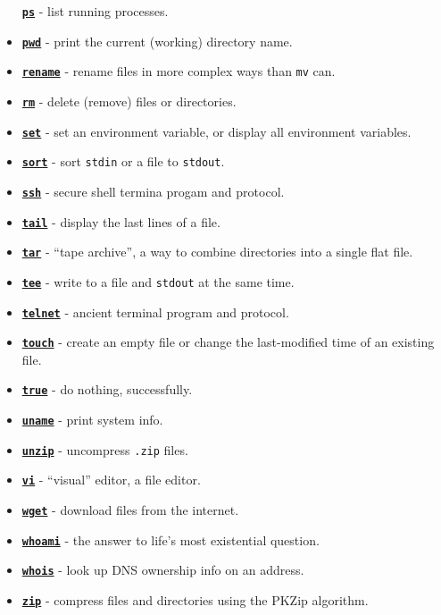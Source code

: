 \documentclass[10pt,]{book}
\numberwithin{figure}{chapter}
\begin{document}
\begin{itemize}
  \href{http://linux.die.net/man/1/ps}{\textbf{\texttt{ps}}} - list
  running processes.
\item
  \href{http://linux.die.net/man/1/pwd}{\textbf{\texttt{pwd}}} - print
  the current (working) directory name.
\item
  \href{http://linux.die.net/man/1/rename}{\textbf{\texttt{rename}}} -
  rename files in more complex ways than \texttt{mv} can.
\item
  \href{http://linux.die.net/man/1/rm}{\textbf{\texttt{rm}}} - delete
  (remove) files or directories.
\item
  \href{http://linux.die.net/man/1/set}{\textbf{\texttt{set}}} - set an
  environment variable, or display all environment variables.
\item
  \href{http://linux.die.net/man/1/sort}{\textbf{\texttt{sort}}} - sort
  \texttt{stdin} or a file to \texttt{stdout}.
\item
  \href{http://linux.die.net/man/1/ssh}{\textbf{\texttt{ssh}}} - secure
  shell termina progam and protocol.
\item
  \href{http://linux.die.net/man/1/tail}{\textbf{\texttt{tail}}} -
  display the last lines of a file.
\item
  \href{http://linux.die.net/man/1/tar}{\textbf{\texttt{tar}}} - ``tape
  archive'', a way to combine directories into a single flat file.
\item
  \href{http://linux.die.net/man/1/tee}{\textbf{\texttt{tee}}} - write
  to a file and \texttt{stdout} at the same time.
\item
  \href{http://linux.die.net/man/1/telnet}{\textbf{\texttt{telnet}}} -
  ancient terminal program and protocol.
\item
  \href{http://linux.die.net/man/1/touch}{\textbf{\texttt{touch}}} -
  create an empty file or change the last-modified time of an existing
  file.
\item
  \href{http://linux.die.net/man/1/true}{\textbf{\texttt{true}}} - do
  nothing, successfully.
\item
  \href{http://linux.die.net/man/1/uname}{\textbf{\texttt{uname}}} -
  print system info.
\item
  \href{http://linux.die.net/man/1/unzip}{\textbf{\texttt{unzip}}} -
  uncompress \texttt{.zip} files.
\item
  \href{http://linux.die.net/man/1/vi}{\textbf{\texttt{vi}}} -
  ``visual'' editor, a file editor.
\item
  \href{http://linux.die.net/man/1/wget}{\textbf{\texttt{wget}}} -
  download files from the internet.
\item
  \href{http://linux.die.net/man/1/whoami}{\textbf{\texttt{whoami}}} -
  the answer to life's most existential question.
\item
  \href{http://linux.die.net/man/1/whois}{\textbf{\texttt{whois}}} -
  look up DNS ownership info on an address.
\item
  \href{http://linux.die.net/man/1/zip}{\textbf{\texttt{zip}}} -
  compress files and directories using the PKZip algorithm.
\end{itemize}
\end{document}
